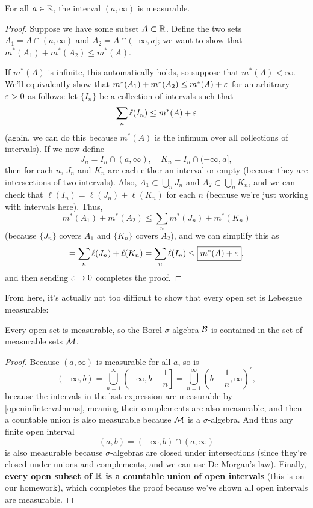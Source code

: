 \begin{proposition}\label{openinfintervalmeas}
For all $a \in \mathbb R$, the interval $(a, \infty)$ is measurable.
\end{proposition}
\begin{proof}
Suppose we have some subset $A \subset \mathbb R$. Define the two sets $A_1 = A \cap (a, \infty)$ and $A_2 = A \cap (-\infty, a]$; we want to show that $m^\ast(A_1) + m^\ast(A_2) \le m^\ast(A)$. 

If $m^\ast(A)$ is infinite, this automatically holds, so suppose that $m^\ast(A) < \infty$. We'll equivalently show that $m^\ast(A_1) + m^\ast(A_2) \le m^\ast(A) + \varepsilon$ for an arbitrary $\varepsilon > 0$ as follows: let $\{I_n\}$ be a collection of intervals such that 
\[
    \sum_n \ell(I_n) \le m^\ast(A) + \varepsilon
\]
(again, we can do this because $m^\ast(A)$ is the infimum over all collections of intervals). If we now define 
\[
    J_n = I_n \cap (a, \infty), \quad K_n = I_n \cap (-\infty, a],
\]
then for each $n$, $J_n$ and $K_n$ are each either an interval or empty (because they are intersections of two intervals). Also, $A_1 \subset \bigcup_n J_n$ and $A_2 \subset \bigcup_n K_n$, and we can check that $\ell(I_n) = \ell(J_n) + \ell(K_n)$ for each $n$ (because we're just working with intervals here). Thus, 
\[
    \boxed{m^\ast(A_1) + m^\ast(A_2)} \le \sum_n m^\ast(J_n) + m^\ast(K_n)
\]
(because $\{J_n\}$ covers $A_1$ and $\{K_n\}$ covers $A_2$), and we can simplify this as 
\[
    = \sum_n \ell(J_n) + \ell(K_n) = \sum_n \ell(I_n) \le \boxed{m^\ast(A) + \varepsilon},
\]
and then sending $\varepsilon \to 0$ completes the proof.
\end{proof}

From here, it's actually not too difficult to show that every open set is Lebesgue measurable:

\begin{theorem}
Every open set is measurable, so the Borel $\sigma$-algebra $\mathcal{B}$ is contained in the set of measurable sets $\mathcal{M}$.
\end{theorem}
\begin{proof}
Because $(a, \infty)$ is measurable for all $a$, so is 
\[
    (-\infty, b) = \bigcup_{n=1}^{\infty} \left(-\infty, b - \frac{1}{n}\right] = \bigcup_{n=1}^{\infty} \left(b - \frac{1}{n}, \infty\right)^c,
\]
because the intervals in the last expression are measurable by \cref{openinfintervalmeas}, meaning their complements are also measurable, and then a countable union is also measurable because $\mathcal{M}$ is a $\sigma$-algebra. And thus any finite open interval 
\[
    (a, b) = (-\infty, b) \cap (a, \infty)
\]
is also measurable because $\sigma$-algebras are closed under intersections (since they're closed under unions and complements, and we can use De Morgan's law). Finally, \textbf{every open subset of $\mathbb R$ is a countable union of open intervals} (this is on our homework), which completes the proof because we've shown all open intervals are measurable. 
\end{proof}

